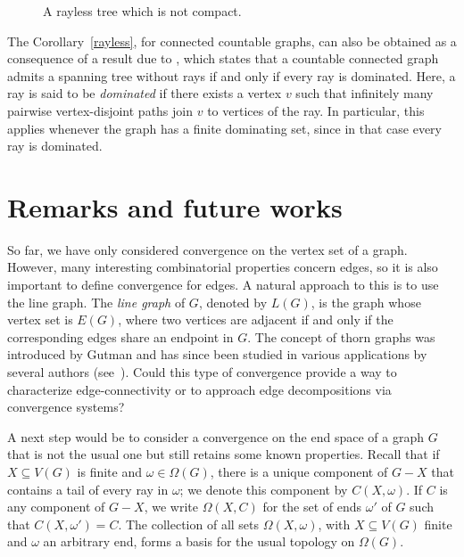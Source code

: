 \documentclass{amsart}
\theoremstyle{definition}
\theoremstyle{remark}
\numberwithin{equation}{section}
\begin{document}
\begin{figure}[H]
\begin{tikzpicture}[x=0.75pt,y=0.75pt,yscale=-1,xscale=1]
			
			
			
		\end{tikzpicture}
		\caption{A rayless tree which is not compact.}
		\label{exm2}
	\end{figure}
	
		 The Corollary~\ref{rayless}, for connected countable graphs, can also be obtained as a consequence of a result due to \cite{kurkofka}, which states that a countable connected graph admits a spanning tree without rays if and only if every ray is dominated. Here, a ray is said to be \emph{dominated} if there exists a vertex $v$ such that infinitely many pairwise vertex-disjoint paths join $v$ to vertices of the ray. In particular, this applies whenever the graph has a finite dominating set, since in that case every ray is dominated.



	


\section{Remarks and future works}


So far, we have only considered convergence on the vertex set of a graph. However, many interesting combinatorial properties concern edges, so it is also important to define convergence for edges. A natural approach to this is to use the line graph. The \textit{line graph} of $G$, denoted by $L(G)$, is the graph whose vertex set is $E(G)$, where two vertices are adjacent if and only if the corresponding edges share an endpoint in $G$.
The concept of thorn graphs was introduced by Gutman and has since been studied in various applications by several authors (see~\cite{BeinekeBagga2021, boska2025edgedirectioncompactedgeendspaces,Chudnovsky2006}). Could this type of convergence provide a way to characterize edge-connectivity or to approach edge decompositions via convergence systems?

A next step would be to consider a convergence on the end space of a graph $G$ that is not the usual one but still retains some known properties. Recall that if $X \subseteq V(G)$ is finite and $\omega \in \Omega(G)$, there is a unique component of $G - X$ that contains a tail of every ray in $\omega$; we denote this component by $C(X,\omega)$. If $C$ is any component of $G - X$, we write $\Omega(X,C)$ for the set of ends $\omega'$ of $G$ such that $C(X,\omega') = C$. The collection of all sets $\Omega(X,\omega)$, with $X \subseteq V(G)$ finite and $\omega$ an arbitrary end, forms a basis for the usual topology on $\Omega(G)$.
\end{document}
